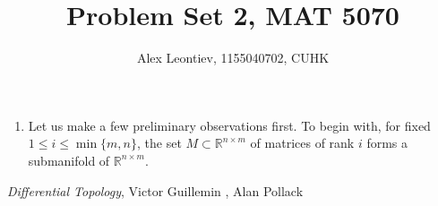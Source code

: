 \documentclass[8pt]{article} %
\title{Problem Set 2, MAT 5070}
\author{Alex Leontiev, 1155040702, CUHK}
\begin{document}
\maketitle
\begin{enumerate}[label=\bfseries \arabic*.]
	\item{Let us make a few preliminary observations first. To begin with, for fixed $1\leq i\leq \min\{m,n\}$, the set $M\subset \mathbb{R}^{n\times m}$
		of matrices of rank $i$ forms a submanifold of $\mathbb{R}^{n\times m}$. 
		}
\end{enumerate}
\begin{thebibliography}{9}
	 {\em Differential Topology}, Victor Guillemin , Alan Pollack
\end{thebibliography}
\end{document}
